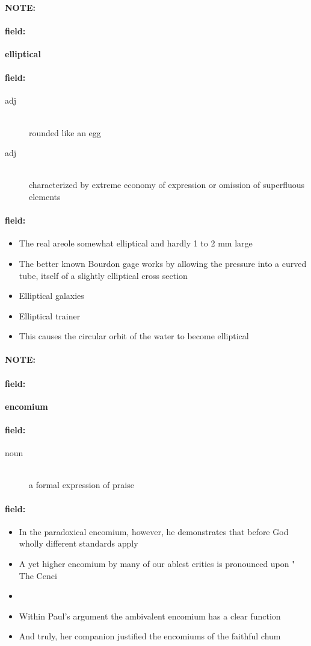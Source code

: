 \documentclass[12pt]{article}
\newenvironment{note}{\paragraph{NOTE:}}{}
\newenvironment{field}{\paragraph{field:}}{}
\begin{document}
\begin{note}
\begin{field}
\textbf{\large elliptical}
\end{field}


\begin{field}
\begin{description}
\item[adj] \hfill \\ 
rounded like an egg

\item[adj] \hfill \\ 
characterized by extreme economy of expression or omission of superfluous elements

\end{description}
\end{field}

\begin{field}
\begin{itemize}
\item The real areole somewhat elliptical and hardly 1 to 2 mm large
\item The better known Bourdon gage works by allowing the pressure into a curved tube, itself of a slightly elliptical cross section
\item Elliptical galaxies
\item Elliptical trainer
\item This causes the circular orbit of the water to become elliptical
\end{itemize}
\end{field}
\end{note}
\begin{note}
\begin{field}
\textbf{\large encomium}
\end{field}


\begin{field}
\begin{description}
\item[noun] \hfill \\ 
a formal expression of praise

\end{description}
\end{field}

\begin{field}
\begin{itemize}
\item In the paradoxical encomium, however, he demonstrates that before God wholly different standards apply
\item A yet higher encomium by many of our ablest critics is pronounced upon " The Cenci
\item 
\item Within Paul's argument the ambivalent encomium has a clear function
\item And truly, her companion justified the encomiums of the faithful chum
\end{itemize}
\end{field}
\end{note}
\end{document}
